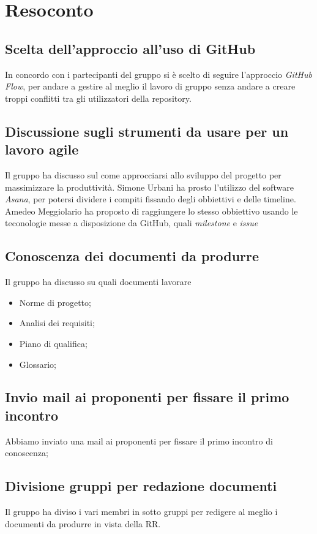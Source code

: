 \documentclass[a4paper]{article}
\begin{document}
    \section{Resoconto}
    
        \subsection{Scelta dell'approccio all'uso di GitHub}
        In concordo con i partecipanti del gruppo si è scelto di seguire l'approccio \textit{GitHub Flow}, per andare a gestire al meglio il lavoro di gruppo senza andare a creare troppi conflitti tra gli utilizzatori della repository.
        
        \subsection{Discussione sugli strumenti da usare per un lavoro agile}
        Il gruppo ha discusso sul come approcciarsi allo sviluppo del progetto per massimizzare la produttività. Simone Urbani ha prosto l'utilizzo del software \textit{Asana}, per potersi dividere i compiti fissando degli obbiettivi e delle timeline. Amedeo Meggiolario ha proposto di raggiungere lo stesso obbiettivo usando le teconologie messe a disposizione da GitHub, quali \textit{milestone} e \textit{issue}

        \subsection{Conoscenza dei documenti da produrre}
        Il gruppo ha discusso su quali documenti lavorare 
        \begin{itemize}
            \item Norme di progetto;
            \item Analisi dei requisiti;
            \item Piano di qualifica;
            \item Glossario;
        \end{itemize}

        \subsection{Invio mail ai proponenti per fissare il primo incontro}
        Abbiamo inviato una mail ai proponenti per fissare il primo incontro di conoscenza;

        \subsection{Divisione gruppi per redazione documenti}
        Il gruppo ha diviso i vari membri in sotto gruppi per redigere al meglio i documenti da produrre in vista della RR.
\end{document}
